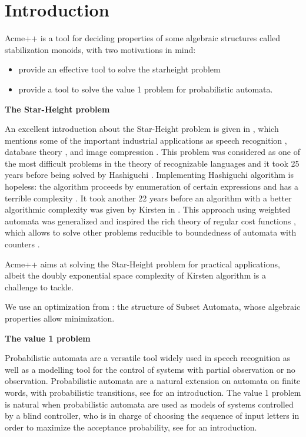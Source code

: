 \section{Introduction}

Acme++ is a tool for deciding properties of some algebraic structures called stabilization monoids,
with two motivations in mind:
\begin{itemize}
\item provide an effective tool to solve the starheight problem
\item provide a tool to solve the value 1 problem for probabilistic automata.
\end{itemize}

\textbf{The Star-Height problem}

An excellent introduction about the Star-Height problem is given in \cite{Kirsten05},
which mentions some of the important industrial applications as
speech recognition \cite{Mohri97}, database theory \cite{GT01}, and image compression \cite{CK93,KMT04}.
This problem was considered as one of the most difficult problems in the theory of recognizable languages
and it took 25 years before being solved by Hashiguchi \cite{Hashiguchi88}.
Implementing Hashiguchi algorithm is hopeless: the algorithm proceeds by enumeration of certain expressions
and has a terrible complexity \cite{LS02}.
It took another 22 years before an algorithm with a better algorithmic complexity was given by Kirsten in \cite{Kirsten05}.
This approach using weighted automata was generalized and inspired the rich theory of regular cost functions \cite{Colcombet09}, which allows to solve other problems reducible to boundedness of automata with counters \cite{CL08sh,CL08b,CKLB13}.

Acme++ aims at solving the Star-Height  problem for practical applications,
albeit the doubly exponential space complexity of Kirsten algorithm is a challenge to tackle.

We use an optimization from \cite{CL08sh}: the structure of Subset Automata, whose algebraic properties allow minimization.
\smallskip

\textbf{The value 1 problem}

Probabilistic automata are a versatile tool widely used in speech recognition as well as a modelling tool 
for the control of systems with partial observation or no observation.
Probabilistic automata are a natural extension on automata on finite words,
with probabilistic transitions, see \cite{Rabin63} for an introduction.
The value 1 problem is natural when probabilistic automata are used as models
of systems controlled by a blind controller, who is in charge of choosing the
sequence of input letters in order to maximize the acceptance
probability, see \cite{FGO12} for an introduction.
\smallskip

